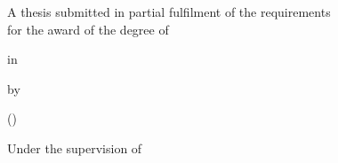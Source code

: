 \begin{titlepage}
  \centering
  {\LARGE\bfseries \thesistitle\par}
  \vspace{1.5cm}
  {\large A thesis submitted in partial fulfilment of the requirements\\
  for the award of the degree of\par}
  \vspace{0.5cm}
  {\Large\bfseries \degree\par}
  {\large in\par}
  {\Large \branch\par}
  \vspace{1.5cm}
  {\large by\par}
  \vspace{0.3cm}
  {\Large\bfseries \authorname\par}
  {\large (\rollno)\par}
  \vspace{1.5cm}
  {\large Under the supervision of\par}
  {\Large \supervisor\par}
  \vfill
  {\large \department\par}
  {\large\bfseries \institute\par}
  {\large \submissionyear\par}
\end{titlepage}
